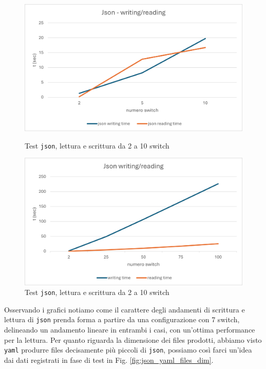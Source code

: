 \documentclass[binding=0.6cm]{sapthesis}
\begin{document}
\begin{figure}[h]
    \centering
    \begin{minipage}{0.48\textwidth}
      \includegraphics[width=\linewidth]{immagini/json_wr_nature.png}
      \caption{Test \texttt{json}, lettura e scrittura da 2 a 10 switch}
      \label{fig:json_wr_nature}
    \end{minipage}\hfill
    \begin{minipage}{0.48\textwidth}
      \includegraphics[width=\linewidth]{immagini/json_writing_reading.png}
      \caption{Test \texttt{json}, lettura e scrittura da 2 a 10 switch}
      \label{fig:json_writing_reading}
    \end{minipage}
\end{figure}

Osservando i grafici notiamo come il carattere degli andamenti di scrittura e lettura di \texttt{json} prenda forma a partire da una configurazione con 7 switch,
delineando un andamento lineare in entrambi i casi, con un'ottima performance per la lettura. Per quanto riguarda la dimensione dei files prodotti, abbiamo visto \texttt{yaml} produrre
files decisamente più piccoli di \texttt{json}, possiamo così farci un'idea dai dati registrati in fase di test in Fig. \ref{fig:json_yaml_files_dim}.
\end{document}
